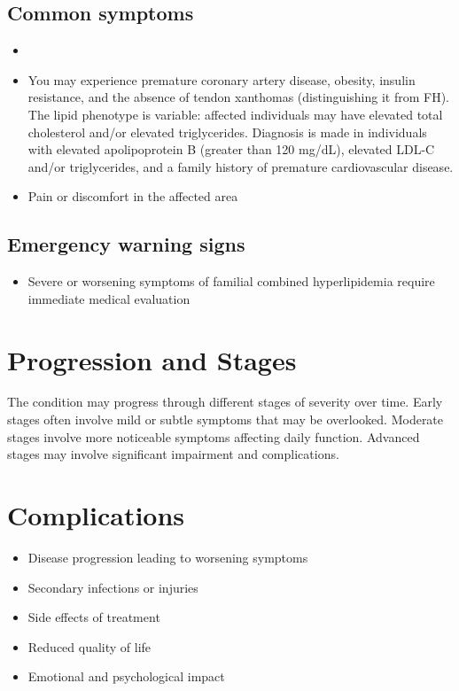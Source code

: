 \subsection{Common symptoms}
\begin{itemize}[noitemsep]
  \item \item You may experience premature coronary artery disease, obesity, insulin resistance, and the absence of tendon xanthomas (distinguishing it from FH). The lipid phenotype is variable: affected individuals may have elevated total cholesterol and/or elevated triglycerides. Diagnosis is made in individuals with elevated apolipoprotein B (greater than 120 mg/dL), elevated LDL-C and/or triglycerides, and a family history of premature cardiovascular disease.
  \item Pain or discomfort in the affected area
  \end{itemize}
\subsection{Emergency warning signs}
\begin{itemize}[noitemsep]
  \item Severe or worsening symptoms of familial combined hyperlipidemia require immediate medical evaluation
\end{itemize}
\section{Progression and Stages}
The condition may progress through different stages of severity over time. Early stages often involve mild or subtle symptoms that may be overlooked. Moderate stages involve more noticeable symptoms affecting daily function. Advanced stages may involve significant impairment and complications.
\section{Complications}
\begin{itemize}[noitemsep]
  \item Disease progression leading to worsening symptoms
  \item Secondary infections or injuries
  \item Side effects of treatment
  \item Reduced quality of life
  \item Emotional and psychological impact
\end{itemize}
